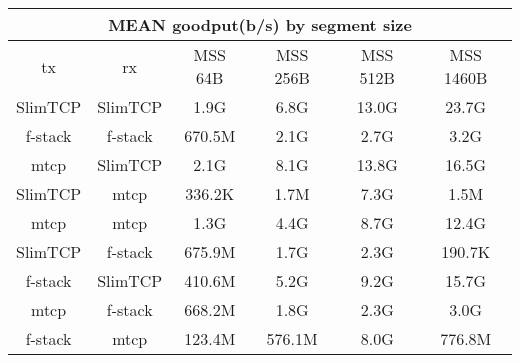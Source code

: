 
\begin{center}
\begin{tabular}{ c c c c c c }
\multicolumn{6}{c}{MEAN goodput(b/s) by segment size} \\
\hline
tx & rx & MSS 64B & MSS 256B & MSS 512B & MSS 1460B \\
SlimTCP & SlimTCP & 1.9G & 6.8G & 13.0G & 23.7G \\
f-stack & f-stack & 670.5M & 2.1G & 2.7G & 3.2G \\
mtcp & SlimTCP & 2.1G & 8.1G & 13.8G & 16.5G \\
SlimTCP & mtcp & 336.2K & 1.7M & 7.3G & 1.5M \\
mtcp & mtcp & 1.3G & 4.4G & 8.7G & 12.4G \\
SlimTCP & f-stack & 675.9M & 1.7G & 2.3G & 190.7K \\
f-stack & SlimTCP & 410.6M & 5.2G & 9.2G & 15.7G \\
mtcp & f-stack & 668.2M & 1.8G & 2.3G & 3.0G \\
f-stack & mtcp & 123.4M & 576.1M & 8.0G & 776.8M \\

\end{tabular}
\end{center}
